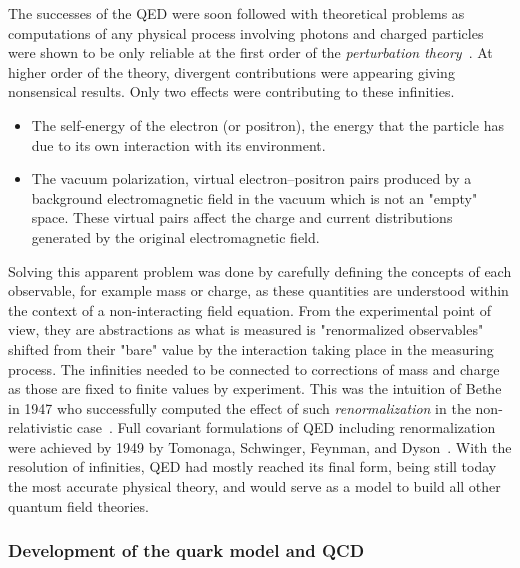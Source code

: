 	The successes of the QED were soon followed with theoretical problems as computations of any physical process involving photons and charged particles were shown to be only reliable at the first order of the \textit{perturbation theory}~\cite{OPPENHEIMER1930II}. At higher order of the theory, divergent contributions were appearing giving nonsensical results. Only two effects were contributing to these infinities.
	
	\begin{itemize}
		\item The self-energy of the electron (or positron), the energy that the particle has due to its own interaction with its environment.
		\item The vacuum polarization, virtual electron–positron pairs produced by a background electromagnetic field in the vacuum which is not an "empty" space. These virtual pairs affect the charge and current distributions generated by the original electromagnetic field.
	\end{itemize}
	
	Solving this apparent problem was done by carefully defining the concepts of each observable, for example mass or charge, as these quantities are understood within the context of a non-interacting field equation. From the experimental point of view, they are abstractions as what is measured is "renormalized observables" shifted from their "bare" value by the interaction taking place in the measuring process. The infinities needed to be connected to corrections of mass and charge as those are fixed to finite values by experiment. This was the intuition of Bethe in 1947 who successfully computed the effect of such \textit{renormalization} in the non-relativistic case~\cite{BETHE1947}. Full covariant formulations of QED including renormalization were achieved by 1949 by Tomonaga, Schwinger, Feynman, and Dyson~\cite{DYSON1949}. With the resolution of infinities, QED had mostly reached its final form, being still today the most accurate physical theory, and would serve as a model to build all other quantum field theories.
	
	\subsubsection*{Development of the quark model and \acl{QCD}}
	\label{chapt2:sssec:quark}
	
